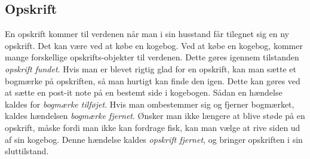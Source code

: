 \subsection{Opskrift}
En opskrift kommer til verdenen når man i sin husstand får tilegnet sig en ny opskrift. Det kan \fx være ved at købe en kogebog. Ved at købe en kogebog, kommer mange forskellige opskrifts-objekter til verdenen. Dette gøres igennem tilstanden \textit{opskrift fundet}. Hvis man er blevet rigtig glad for en opskrift, kan man sætte et bogmærke på opskriften, så man hurtigt kan finde den igen. Dette kan \fx gøres ved at sætte en post-it note på en bestemt side i kogebogen. Sådan en hændelse kaldes for \textit{bogmærke tilføjet}. Hvis man ombestemmer sig og fjerner bogmærket, kaldes hændelsen \textit{bogmærke fjernet}. Ønsker man ikke længere at blive støde på en opskrift, måske fordi man ikke kan fordrage fisk, kan man vælge at rive siden ud af sin kogebog. Denne hændelse kaldes \textit{opskrift fjernet}, og bringer opskriften i sin sluttilstand.
\begin{figure}[htp]
\centering
\scalebox{0.6}{
}
\label{fig:opskrift-adfaerd}
\end{figure}	